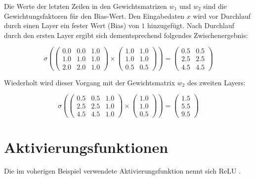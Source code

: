 Die Werte der letzten Zeilen in den Gewichtsmatrizen $ w_{1} $ und $ w_{2} $ sind die Gewichtungsfaktoren für den Bias-Wert. Den Eingabedaten $ x $ wird vor Durchlauf durch einen Layer ein fester Wert (Bias) von $ 1 $ hinzugefügt. Nach Durchlauf durch den ersten Layer ergibt sich dementsprechend folgendes Zwischenergebnis:

\begin{equation}
	\sigma \left(
	\begin{pmatrix} 
		0.0 & 0.0 & 1.0 \\
		1.0 & 1.0 & 1.0 \\ 
		2.0 & 2.0 & 1.0
	\end{pmatrix} 
	\times
	\begin{pmatrix} 
		1.0 & 1.0 \\
		1.0 & 1.0 \\ 
		0.5 & 0.5
	\end{pmatrix}
	\right)
	= 
	\begin{pmatrix} 
		0.5 & 0.5 \\
		2.5 & 2.5 \\ 
		4.5 & 4.5
	\end{pmatrix}
\end{equation}

Wiederholt wird dieser Vorgang mit der Gewichtsmatrix $ w_{2} $ des zweiten Layers:

\begin{equation}
	\sigma \left(
	\begin{pmatrix} 
		0.5 & 0.5 & 1.0 \\
		2.5 & 2.5 & 1.0 \\ 
		4.5 & 4.5 & 1.0
	\end{pmatrix}
	\times
	\begin{pmatrix} 
		1.0 \\
		1.0 \\ 
		0.5
	\end{pmatrix}
	\right)
	= 
	\begin{pmatrix} 
		1.5 \\
		5.5 \\ 
		9.5
	\end{pmatrix}
\end{equation}

\section{Aktivierungsfunktionen}
\label{sec:activation_functions}

Die im voherigen Beispiel verwendete Aktivierungsfunktion nennt sich ReLU \cite{Nair:2010:RLU:3104322.3104425}.

